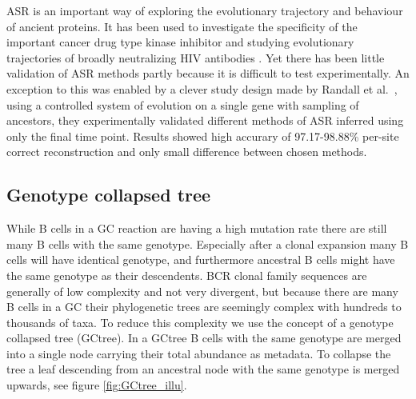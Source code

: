 ASR is an important way of exploring the evolutionary trajectory and behaviour of ancient proteins.
It has been used to investigate the specificity of the important cancer drug type kinase inhibitor \cite{Wilson2015-vi} and studying evolutionary trajectories of broadly neutralizing HIV antibodies \cite{Doria-Rose2014-vi}.
Yet there has been little validation of ASR methods partly because it is difficult to test experimentally.
An exception to this was enabled by a clever study design made by Randall et al.\ \cite{randall2016experimental}, using a controlled system of evolution on a single gene with sampling of ancestors, they experimentally validated different methods of ASR inferred using only the final time point.
Results showed high accurary of 97.17-98.88\% per-site correct reconstruction and only small difference between chosen methods.




\subsection{Genotype collapsed tree}
While B cells in a GC reaction are having a high mutation rate there are still many B cells with the same genotype.
Especially after a clonal expansion many B cells will have identical genotype, and furthermore ancestral B cells might have the same genotype as their descendents.
BCR clonal family sequences are generally of low complexity and not very divergent, but because there are many B cells in a GC their phylogenetic trees are seemingly complex with hundreds to thousands of taxa.
To reduce this complexity we use the concept of a genotype collapsed tree (GCtree).
In a GCtree B cells with the same genotype are merged into a single node carrying their total abundance as metadata.
To collapse the tree a leaf descending from an ancestral node with the same genotype is merged upwards, see figure \ref{fig:GCtree_illu}.

